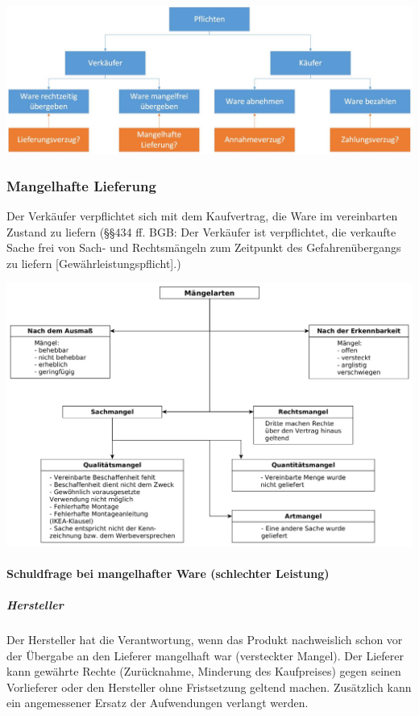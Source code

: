 \includegraphics[scale=0.35]{1jahr_pictures/lf01-pic/lf01-pflichten-kaufvertrag.jpg}

\subsubsection{Mangelhafte Lieferung}
Der Verkäufer verpflichtet sich mit dem Kaufvertrag, die Ware im vereinbarten Zustand zu liefern (§§434 ff. BGB: Der Verkäufer ist verpflichtet, die verkaufte Sache frei von Sach- und Rechtsmängeln zum Zeitpunkt des Gefahrenübergangs zu liefern [Gewährleistungspflicht].)

\includegraphics[scale=0.26]{1jahr_pictures/lf01-pic/lf01-maengelarten.png}

\paragraph{Schuldfrage bei mangelhafter Ware (schlechter Leistung)}
	
\subparagraph{Hersteller} Der Hersteller hat die Verantwortung, wenn das Produkt nachweislich schon vor der Übergabe an den Lieferer mangelhaft war (versteckter Mangel). Der Lieferer kann gewährte Rechte (Zurücknahme, Minderung des Kaufpreises) gegen seinen Vorlieferer oder den Hersteller ohne Fristsetzung geltend machen. Zusätzlich kann ein angemessener Ersatz der Aufwendungen verlangt werden.

